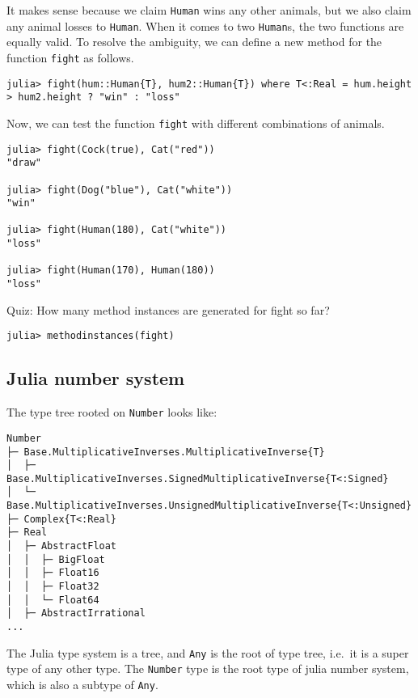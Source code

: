 \documentclass[
  notoc %
]{tufte-book}
\newcommand{\passthrough}[1]{#1}
\begin{document}
It makes sense because we claim \passthrough{\lstinline!Human!} wins any
other animals, but we also claim any animal losses to
\passthrough{\lstinline!Human!}. When it comes to two
\passthrough{\lstinline!Human!}s, the two functions are equally valid.
To resolve the ambiguity, we can define a new method for the function
\passthrough{\lstinline!fight!} as follows.

\begin{lstlisting}
julia> fight(hum::Human{T}, hum2::Human{T}) where T<:Real = hum.height > hum2.height ? "win" : "loss"
\end{lstlisting}

Now, we can test the function \passthrough{\lstinline!fight!} with
different combinations of animals.

\begin{lstlisting}
julia> fight(Cock(true), Cat("red"))
"draw"

julia> fight(Dog("blue"), Cat("white"))
"win"

julia> fight(Human(180), Cat("white"))
"loss"

julia> fight(Human(170), Human(180))
"loss"
\end{lstlisting}

Quiz: How many method instances are generated for fight so far?

\begin{lstlisting}
julia> methodinstances(fight)
\end{lstlisting}

\hypertarget{julia-number-system}{%
\subsection{Julia number system}\label{julia-number-system}}

The type tree rooted on \passthrough{\lstinline!Number!} looks like:

\begin{lstlisting}
Number
├─ Base.MultiplicativeInverses.MultiplicativeInverse{T}
│  ├─ Base.MultiplicativeInverses.SignedMultiplicativeInverse{T<:Signed}
│  └─ Base.MultiplicativeInverses.UnsignedMultiplicativeInverse{T<:Unsigned}
├─ Complex{T<:Real}
├─ Real
│  ├─ AbstractFloat
│  │  ├─ BigFloat
│  │  ├─ Float16
│  │  ├─ Float32
│  │  └─ Float64
│  ├─ AbstractIrrational
...
\end{lstlisting}

The Julia type system is a tree, and \passthrough{\lstinline!Any!} is
the root of type tree, i.e.~it is a super type of any other type. The
\passthrough{\lstinline!Number!} type is the root type of julia number
system, which is also a subtype of \passthrough{\lstinline!Any!}.
\end{document}
